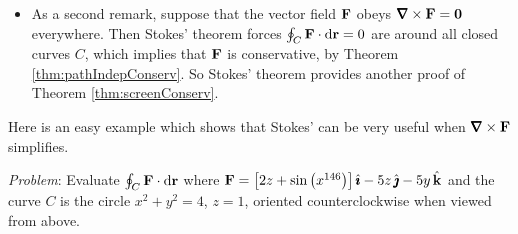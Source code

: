 \begin{itemize}
\item
As a second remark, suppose that the vector field $\mathbf{F}$ obeys $\vnabla\times\vF=\vZero$ everywhere. Then Stokes' theorem forces
$\oint_{C}\mathbf{F}\cdot \mathrm{d}\mathbf{r}=0$ are around all closed curves $C$,
which implies that $\mathbf{F}$ is conservative, by 
Theorem \ref{thm:pathIndepConserv}. So Stokes' theorem provides
another proof of Theorem \ref{thm:screenConserv}.

\end{itemize}

Here is an easy example which shows that Stokes' can be very useful 
when $\vnabla\times\vF$ simplifies.


\begin{eg}\label{eg:stokesAA}
\noindent\textit{Problem}:
Evaluate
$
\oint_C\mathbf{F}\cdot\mathrm{d}\mathbf{r}
$
where $\mathbf{F}= \big[2z+\sin\big(x^{146}\big)\big]\,\hat{\pmb{\imath}}-5z\,\hat{\pmb{\jmath}} -5y\,\hat{\mathbf{k}}$ 
and the curve $C$ is the circle $x^2+y^2=4$, $z=1$, 
oriented counterclockwise when viewed from above.


\end{eg}
